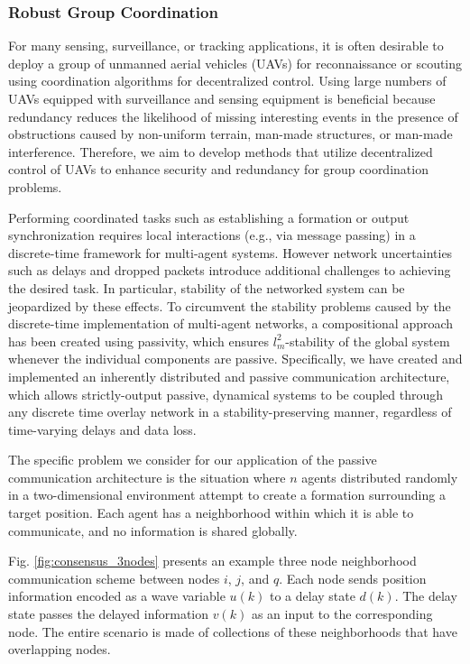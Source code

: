 \subsubsection{Robust Group Coordination}

For many sensing, surveillance, or tracking applications, it is often desirable to deploy a group of unmanned aerial vehicles (UAVs) for reconnaissance or scouting using coordination algorithms for decentralized control. Using large numbers of UAVs equipped with surveillance and sensing equipment is beneficial because redundancy reduces the likelihood of missing interesting events in the presence of obstructions caused by non-uniform terrain, man-made structures, or man-made interference. Therefore, we aim to develop methods that utilize decentralized control of UAVs to enhance security and redundancy for group coordination problems.

Performing coordinated tasks such as establishing a formation or output synchronization requires local interactions (e.g., via message passing) in a discrete-time framework for multi-agent systems. However network uncertainties such as delays and dropped packets introduce additional challenges to achieving the desired task. In particular, stability of the networked system can be jeopardized by these effects.  To circumvent the stability problems caused by the discrete-time implementation of multi-agent networks, a compositional approach has been created using passivity, which ensures $l_m^2$-stability of the global system whenever the individual components are passive.  Specifically, we have created and implemented an inherently distributed and passive communication architecture, which allows strictly-output passive, dynamical systems to be coupled through any discrete time overlay network in a stability-preserving manner, regardless of time-varying delays and data loss.

The specific problem we consider for our application of the passive communication architecture is the situation where $n$ agents distributed randomly in a two-dimensional environment attempt to create a formation surrounding a target position. Each agent has a neighborhood within which it is able to communicate, and no information is shared globally.

Fig. \ref{fig:consensus_3nodes} presents an example three node neighborhood communication scheme between nodes $i$, $j$, and $q$.  Each node sends position information encoded as a wave variable $u(k)$ to a delay state $d(k)$. The delay state passes the delayed information $v(k)$ as an input to the corresponding node.  The entire scenario is made of collections of these neighborhoods that have overlapping nodes.

